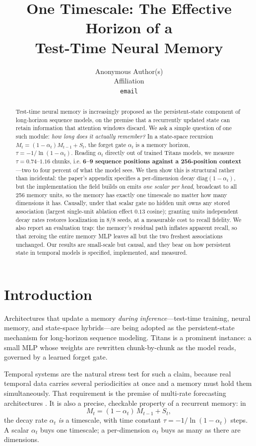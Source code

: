 \documentclass{article}
\title{One Timescale: The Effective Horizon of a\\Test-Time Neural Memory}
\author{Anonymous Author(s)\\Affiliation\\\texttt{email}}
\begin{document}
\maketitle

\begin{abstract}
Test-time neural memory is increasingly proposed as the persistent-state
component of long-horizon sequence models, on the premise that a recurrently
updated state can retain information that attention windows discard. We ask a
simple question of one such module: \emph{how long does it actually remember?}
In a state-space recursion $M_t=(1-\alpha_t)M_{t-1}+S_t$, the forget gate
$\alpha_t$ is a memory horizon, $\tau=-1/\ln(1-\alpha_t)$. Reading $\alpha_t$
directly out of trained Titans models, we measure $\tau=0.74$--$1.16$ chunks,
i.e. \textbf{6--9 sequence positions against a 256-position context}---two to
four percent of what the model sees. We then show this is structural rather
than incidental: the paper's appendix specifies a per-dimension decay
$\mathrm{diag}(1-\alpha_t)$, but the implementation the field builds on emits
\emph{one scalar per head}, broadcast to all 256 memory units, so the memory
has exactly one timescale no matter how many dimensions it has. Causally, under
that scalar gate no hidden unit owns any stored association (largest
single-unit ablation effect $0.13$ cosine); granting units independent decay
rates restores localization in $8/8$ seeds, at a measurable cost to recall
fidelity. We also report an evaluation trap: the memory's residual path
inflates apparent recall, so that zeroing the entire memory MLP leaves all but
the two freshest associations unchanged. Our results are small-scale but
causal, and they bear on how persistent state in temporal models is specified,
implemented, and measured.
\end{abstract}

\section{Introduction}

Architectures that update a memory \emph{during inference}---test-time
training, neural memory, and state-space hybrids---are being adopted as the
persistent-state mechanism for long-horizon sequence modeling. Titans
\citep{behrouz2025titans} is a prominent instance: a small MLP whose weights are
rewritten chunk-by-chunk as the model reads, governed by a learned forget gate.

Temporal systems are the natural stress test for such a claim, because real
temporal data carries several periodicities at once and a memory must hold them
simultaneously. That requirement is the premise of multi-rate forecasting
architectures \citep{challu2023nhits}. It is also a precise, checkable property
of a recurrent memory: in
\begin{equation}
M_t = (1-\alpha_t)\,M_{t-1} + S_t,
\label{eq:update}
\end{equation}
the decay rate $\alpha_t$ \emph{is} a timescale, with time constant
$\tau=-1/\ln(1-\alpha_t)$ steps. A scalar $\alpha_t$ buys one timescale; a
per-dimension $\alpha_t$ buys as many as there are dimensions.
\end{document}

